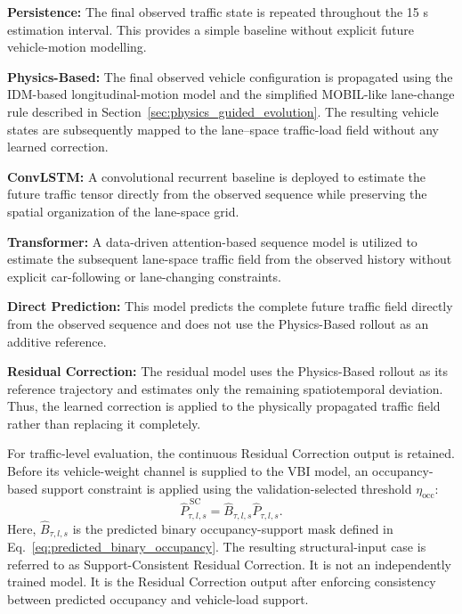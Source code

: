 \documentclass[journal]{IEEEtran}
\begin{document}
\textbf{Persistence:}
The final observed traffic state is repeated throughout the 15 s estimation interval. This provides a simple baseline without explicit future vehicle-motion modelling.

\textbf{Physics-Based:}
The final observed vehicle configuration is propagated using the IDM-based longitudinal-motion model and the simplified MOBIL-like lane-change rule described in Section~\ref{sec:physics_guided_evolution}. The resulting vehicle states are subsequently mapped to the lane--space traffic-load field without any learned correction.

\textbf{ConvLSTM:}
A convolutional recurrent baseline is deployed to estimate the future traffic tensor directly from the observed sequence while preserving the spatial organization of the lane-space grid.

\textbf{Transformer:}
A data-driven attention-based sequence model is utilized to estimate the subsequent lane-space traffic field from the observed history without explicit car-following or lane-changing constraints.

\textbf{Direct Prediction:}
This model predicts the complete future traffic field directly from the observed sequence and does not use the Physics-Based rollout as an additive reference.

\textbf{Residual Correction:}
The residual model uses the Physics-Based rollout as its reference trajectory and estimates only the remaining spatiotemporal deviation. Thus, the learned correction is applied to the physically propagated traffic field rather than replacing it completely.

For traffic-level evaluation, the continuous Residual Correction output is retained. Before its vehicle-weight channel is supplied to the VBI model, an occupancy-based support constraint is applied using the validation-selected threshold $\eta_{\mathrm{occ}}$:
\begin{equation}
\widehat{P}^{\,\mathrm{SC}}_{\tau,l,s}=\widehat{B}_{\tau,l,s}\widehat{P}_{\tau,l,s}.
\label{eq:support_consistent_load}
\end{equation}
Here, $\widehat{B}_{\tau,l,s}$ is the predicted binary occupancy-support mask defined in Eq.~\eqref{eq:predicted_binary_occupancy}.
The resulting structural-input case is referred to as Support-Consistent Residual Correction. It is not an independently trained model. It is the Residual Correction output after enforcing consistency between predicted occupancy and vehicle-load support.
\end{document}
